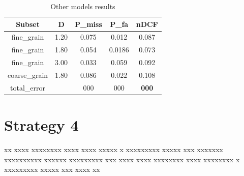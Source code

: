 \documentclass[conference]{IEEEtran}
\begin{document}
\begin{table}[h!]
\begin{center}
\begin{tabular}{ c c c c c }
 Subset & D & P\_miss & P\_fa & nDCF  \\ \hline
 fine\_grain & 1.20 & 0.075 & 0.012 & 0.087 \\ 
 fine\_grain & 1.80 & 0.054 & 0.0186 & 0.073 \\  
 fine\_grain & 3.00 & 0.033 & 0.059 & 0.092 \\
 coarse\_grain & 1.80 & 0.086 & 0.022 & 0.108 \\ \hline
 total\_error & & 000 & 000 & \textbf{000}
\end{tabular}
\caption{Other models results}
\label{table:other}
\end{center}
\end{table}

\section{Strategy 4}
xx xxxx xxxxxxxx xxxx xxxx xxxxx x xxxxxxxxx xxxxx xxx xxxxxxx xxxxxxxxxx xxxxxx xxxxxxxxx xxx xxxx xxxx xxxxxxxx xxxx xxxxxxxx x xxxxxxxxx xxxxx xxx xxxx xx\\
\begin{table} [!h]
\centering
{}
    \caption{ Results compared to state of the art}
\label{table:results}
\end{table}
\end{document}
